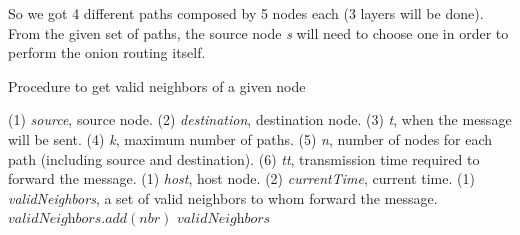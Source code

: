 \noindent{}

So we got 4 different paths composed by 5 nodes each (3 layers will be done). From the given set of paths, the source node \textit{s} will need to choose one in order to perform the onion routing itself.

\begin{algorithm}
\caption{Procedure to get valid neighbors of a given node}
\label{alg:get-neighbors}
\begin{algorithmic}[1]
\INHERIT (1) \textit{source}, source node. (2) \textit{destination}, destination node. (3) \textit{t}, when the message will be sent. (4) \textit{k}, maximum number of paths. (5) \textit{n}, number of nodes for each path (including source and destination). (6) \textit{tt}, transmission time required to forward the message.
\INPUT (1) \textit{host}, host node. (2) \textit{currentTime}, current time.
\OUTPUT (1) \textit{validNeighbors}, a set of valid neighbors to whom forward the message.
		\State $\textit{validNeighbors}.add(\textit{nbr})$
	\EndIf
\EndFor
\State \Return $\textit{validNeighbors}$
\EndProcedure
\end{algorithmic}
\end{algorithm}

